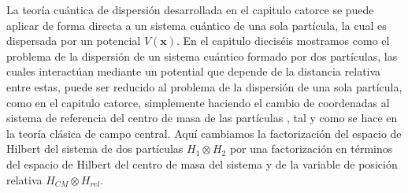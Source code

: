 \documentclass[12pt]{book}
\numberwithin{equation}{chapter}
\def\pr{\otimes}
\def\x{\mathbf{x}}
\begin{document}
La teor\'ia cu\'antica de dispersi\'on desarrollada en el capitulo catorce se puede aplicar de forma directa a un sistema cu\'antico de una sola part\'icula, la cual es dispersada por un potencial $V(\x)$. En el capitulo diecis\'eis mostramos como el problema de la dispersi\'on de un sistema cu\'antico formado por dos part\'iculas, las cuales interact\'uan mediante un potential que depende de la distancia relativa entre estas, puede ser reducido al problema de la dispersi\'on de una sola part\'icula, como en el capitulo catorce, simplemente haciendo el cambio de coordenadas al sistema de referencia del centro de masa de las part\'iculas , tal y como se hace en la teor\'ia cl\'asica de campo central. Aqu\'i cambiamos la factorizaci\'on del espacio de Hilbert del sistema de dos part\'iculas $H_{1} \pr H_{2}$ por una factorizaci\'on en t\'erminos del espacio de Hilbert del centro de masa del sistema y de la variable de posici\'on relativa $H_{CM} \pr H_{rel}$.\\
\end{document}
